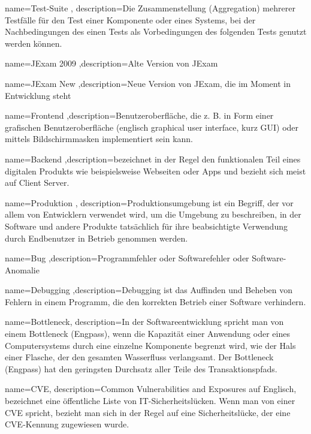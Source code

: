 {name=Test-Suite , description={Die Zusammenstellung (Aggregation) mehrerer Testf\"alle f\"ur den Test einer Komponente oder eines Systems, bei der Nachbedingungen des einen Tests als Vorbedingungen des folgenden Tests genutzt werden k\"onnen.}}

{name=JExam 2009 ,description={Alte Version von JExam}}

{name=JExam New ,description={Neue Version von JExam, die im Moment in Entwicklung steht}}

{name=Frontend ,description={Benutzeroberfl\"ache, die z. B. in Form einer grafischen Benutzeroberfl\"ache (englisch graphical user interface, kurz GUI) oder mittels Bildschirmmasken implementiert sein kann.}}

{name=Backend ,description={bezeichnet in der Regel den funktionalen Teil eines digitalen Produkts wie beispielsweise Webseiten oder Apps und bezieht sich meist auf Client Server.}}

{name=Produktion , description={Produktionsumgebung ist ein Begriff, der vor allem von Entwicklern verwendet wird, um die Umgebung zu beschreiben, in der Software und andere Produkte tats\"achlich f\"ur ihre beabsichtigte Verwendung durch Endbenutzer in Betrieb genommen werden.}}

{name=Bug ,description={Programmfehler oder Softwarefehler oder Software-Anomalie}}

{name=Debugging ,description={Debugging ist das Auffinden und Beheben von Fehlern in einem Programm, die den korrekten Betrieb einer Software verhindern.}}

{name=Bottleneck, description={In der Softwareentwicklung spricht man von einem Bottleneck (Engpass), wenn die Kapazit\"at einer Anwendung oder eines Computersystems durch eine einzelne Komponente begrenzt wird, wie der Hals einer Flasche, der den gesamten Wasserfluss verlangsamt. Der Bottleneck (Engpass) hat den geringsten Durchsatz aller Teile des Transaktionspfads.}}

{name=CVE, description={Common Vulnerabilities and Exposures auf Englisch, bezeichnet eine \"offentliche Liste von IT-Sicherheitsl\"ucken. Wenn man von einer CVE spricht, bezieht man sich in der Regel auf eine Sicherheitsl\"ucke, der eine CVE-Kennung zugewiesen wurde.}}